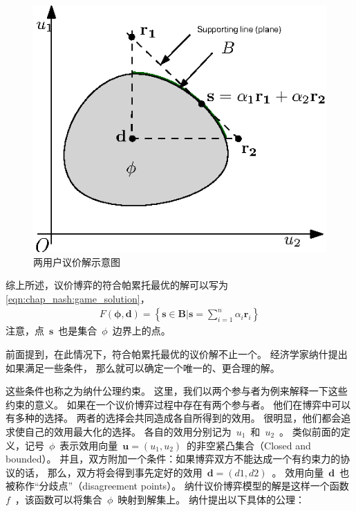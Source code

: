 \begin{figure}[!tb] 
    \centering
   \begin{minipage}[t]{0.6\linewidth} 
    \centering 
    \includegraphics[width = \textwidth]{chap_nash_2_dim_nash_bargain.eps} 
    \caption{两用户议价解示意图} 
    \label{fig:chap_bargain:2_dim_nash_bargain} 
  \end{minipage}%
\end{figure}

综上所述，议价博弈的符合帕累托最优的解可以写为\eqref{eqn:chap_nash:game_solution}，
\begin{align}
    F(\mathbf{\phi},\mathbf{d}) = \left\{ \mathbf{s} \in \mathbf{B} \big \vert \mathbf{s} = \sum_{i=1}^n \alpha_i \mathbf{r}_i \right\}
    \label{eqn:chap_nash:game_solution}
\end{align}
注意，点~$\mathbf{s}$~也是集合~$\phi$~边界上的点。

前面提到，在此情况下，符合帕累托最优的议价解不止一个。
经济学家纳什提出如果满足一些条件，
那么就可以确定一个唯一的、更合理的解\cite{Nash_1950}。

这些条件也称之为纳什公理约束。
这里，我们以两个参与者为例来解释一下这些约束的意义。
如果在一个议价博弈过程中存在有两个参与者。
他们在博弈中可以有多种的选择。
两者的选择会共同造成各自所得到的效用。
很明显，他们都会追求使自己的效用最大化的选择。
各自的效用分别记为~$u_1$~和~$u_2$~。
类似前面的定义，记号~$\phi$~表示效用向量~$\mathbf{u}=(u_1, u_2)$~的非空紧凸集合（Closed and bounded）。
并且，双方附加一个条件：如果博弈双方不能达成一个有约束力的协议的话，
那么，双方将会得到事先定好的效用~$\mathbf{d}=(d1, d2)$~。
效用向量~$\mathbf{d}$~也被称作“分歧点”（disagreement points）。
纳什议价博弈模型的解是这样一个函数~$f$~，该函数可以将集合~$\phi$~映射到解集上。
纳什提出以下具体的公理：


